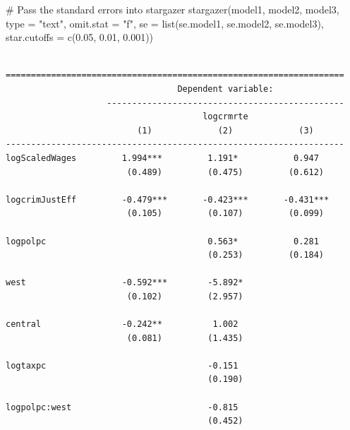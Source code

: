 \documentclass[]{article}
\newenvironment{Shaded}{}{}
\newcommand{\CommentTok}[1]{\textcolor[rgb]{0.00,0.50,0.00}{#1}}
\newcommand{\DataTypeTok}[1]{#1}
\newcommand{\FloatTok}[1]{#1}
\newcommand{\KeywordTok}[1]{\textcolor[rgb]{0.00,0.00,1.00}{#1}}
\newcommand{\NormalTok}[1]{#1}
\newcommand{\StringTok}[1]{\textcolor[rgb]{0.00,0.50,0.50}{#1}}
\begin{document}
\begin{Shaded}
\begin{Highlighting}[]
\CommentTok{# Pass the standard errors into stargazer}
\KeywordTok{stargazer}\NormalTok{(model1, model2, model3, }\DataTypeTok{type =} \StringTok{"text"}\NormalTok{, }\DataTypeTok{omit.stat =} \StringTok{"f"}\NormalTok{,}
          \DataTypeTok{se =} \KeywordTok{list}\NormalTok{(se.model1, se.model2, se.model3),}
          \DataTypeTok{star.cutoffs =} \KeywordTok{c}\NormalTok{(}\FloatTok{0.05}\NormalTok{, }\FloatTok{0.01}\NormalTok{, }\FloatTok{0.001}\NormalTok{))}
\end{Highlighting}
\end{Shaded}

\begin{verbatim}

===================================================================
                                  Dependent variable:              
                    -----------------------------------------------
                                       logcrmrte                   
                          (1)             (2)             (3)      
-------------------------------------------------------------------
logScaledWages         1.994***         1.191*           0.947     
                        (0.489)         (0.475)         (0.612)    
                                                                   
logcrimJustEff         -0.479***       -0.423***       -0.431***   
                        (0.105)         (0.107)         (0.099)    
                                                                   
logpolpc                                0.563*           0.281     
                                        (0.253)         (0.184)    
                                                                   
west                   -0.592***        -5.892*                    
                        (0.102)         (2.957)                    
                                                                   
central                -0.242**          1.002                     
                        (0.081)         (1.435)                    
                                                                   
logtaxpc                                -0.151                     
                                        (0.190)                    
                                                                   
logpolpc:west                           -0.815                     
                                        (0.452)                    
                                                                   

\end{verbatim}
\end{document}
